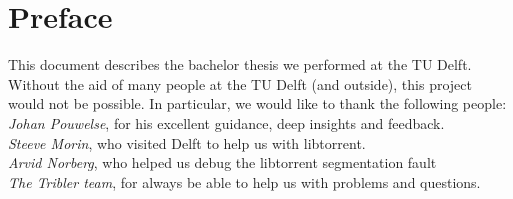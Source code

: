 \chapter*{Preface}
This document describes the bachelor thesis we performed at the TU Delft. Without the aid of many people at the TU Delft (and outside), this project would not be possible. In particular, we would like to thank the following people: \\

\emph{Johan Pouwelse}, for his excellent guidance, deep insights and feedback.\\

\emph{Steeve Morin}, who visited Delft to help us with libtorrent.\\

\emph{Arvid Norberg}, who helped us debug the libtorrent segmentation fault\\

\emph{The Tribler team}, for always be able to help us with problems and questions.